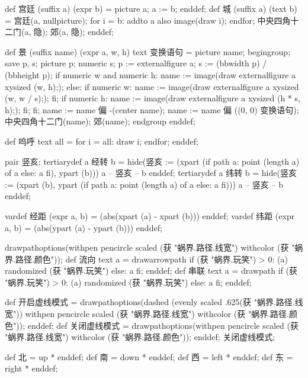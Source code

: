 \startMPinclusions[+]
def 宫廷 (suffix a) (expr b) = picture a; a := b; enddef;
def 城 (suffix a) (text b) =
  宫廷(a, nullpicture);
  for i = b: addto a also image(draw i); endfor;
  中央四角十二门(a, 隐); 郊(a, 隐);
enddef;
\stopMPinclusions

\startMPinclusions[+]
def 景 (suffix name) (expr a, w, h) text 变换语句 =
  picture name;
  begingroup;
  save p, s; picture p; numeric s;
  p := externalfigure a;
  s := (bbwidth p) / (bbheight p);
  if numeric w and numeric h:
    name := image(draw externalfigure a xysized (w, h););
  else:
    if numeric w:
      name := image(draw externalfigure a xysized (w, w / s););
    fi;
    if numeric h:
       name := image(draw externalfigure a xysized (h * s, h););
    fi;
  fi;
  name := name 偏 -(center name); %
  name := name 偏 ((0, 0) 变换语句); 
  中央四角十二门(name); 郊(name);
  endgroup
enddef;

def 呜呼 text all =
  for i = all: draw i; endfor;
enddef;
\stopMPinclusions

\startMPinclusions[+]
pair 竖亥;
tertiarydef a 经转 b =
  hide(竖亥 := (xpart (if path a: point (length a) of a else: a fi), ypart (b)))
  a -- 竖亥 -- b
enddef;
tertiarydef a 纬转 b =
  hide(竖亥 := (xpart (b), ypart (if path a: point (length a) of a else: a fi)))
  a --  竖亥 -- b
enddef;
\stopMPinclusions

\startMPinclusions[+]
vardef 经距 (expr a, b) = (abs(xpart (a) - xpart (b))) enddef;
vardef 纬距 (expr a, b) = (abs(ypart (a) - ypart (b))) enddef;
\stopMPinclusions

\startMPinclusions[+]
drawpathoptions(withpen pencircle scaled (获 "蜗界.路径.线宽") withcolor (获 "蜗界.路径.颜色"));
def 流向 text a =
  drawarrowpath if (获 "蜗界.玩笑") > 0: (a) randomized (获 "蜗界.玩笑") else: a fi;
enddef;
def 串联 text a =
  drawpath if (获 "蜗界.玩笑") > 0: (a) randomized (获 "蜗界.玩笑") else: a fi;  
enddef;
\stopMPinclusions

\startMPinclusions[+]
def 开启虚线模式 =
  drawpathoptions(dashed (evenly scaled .625(获 "蜗界.路径.线宽"))
                  withpen pencircle scaled (获 "蜗界.路径.线宽")
                  withcolor (获 "蜗界.路径.颜色"));
enddef;
def 关闭虚线模式 =
  drawpathoptions(withpen pencircle scaled (获 "蜗界.路径.线宽")
                  withcolor (获 "蜗界.路径.颜色"));
enddef;
关闭虚线模式;
\stopMPinclusions

\startMPinclusions[+]
def 北 = up * enddef; 
def 南 = down * enddef;
def 西 = left * enddef; 
def 东 = right * enddef;

